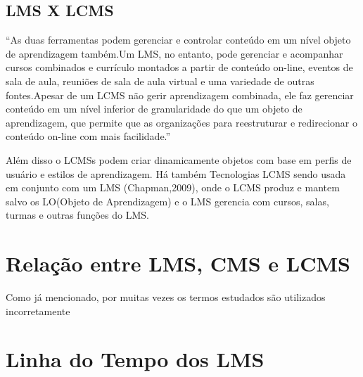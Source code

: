 \documentclass[12pt]{article}
\begin{document}
\subsection{LMS X LCMS}

“As duas ferramentas podem gerenciar e controlar conteúdo em um nível objeto de aprendizagem também.Um LMS, no entanto, pode gerenciar e 
acompanhar cursos combinados e currículo montados a partir de conteúdo on-line, eventos de sala de aula, reuniões de sala de aula virtual e uma 
variedade de outras fontes.Apesar de um LCMS não gerir aprendizagem combinada, ele faz gerenciar conteúdo em um nível inferior de granularidade do 
que um objeto de aprendizagem, que permite que as organizações para reestruturar e redirecionar o conteúdo on-line com mais facilidade.”

Além disso o LCMSs podem criar dinamicamente objetos com base em perfis de usuário e estilos de aprendizagem. Há também Tecnologias LCMS sendo 
usada em conjunto com um LMS (Chapman,2009), onde o LCMS produz e mantem salvo os LO(Objeto de Aprendizagem) e o LMS gerencia com cursos, salas, 
turmas e outras funções do LMS.

\section{Relação entre LMS, CMS e LCMS}
 
Como já mencionado, por muitas vezes os termos estudados são utilizados incorretamente




\newpage
\appendix
\section{Linha do Tempo dos LMS}
\end{document}
